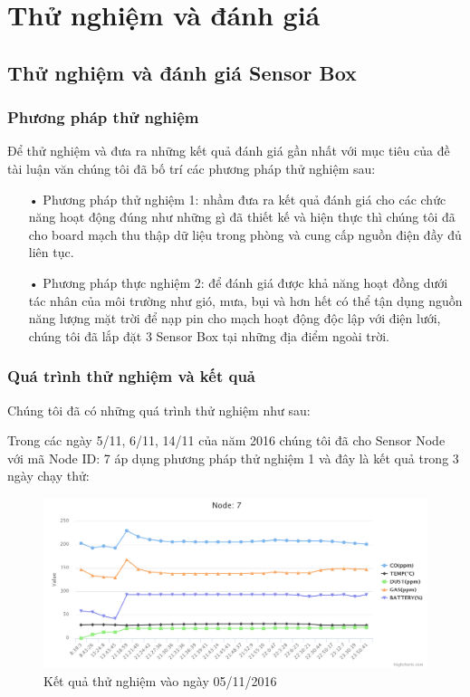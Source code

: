 \section{Thử nghiệm và đánh giá}
\subsection{Thử nghiệm và đánh giá Sensor Box}
\subsubsection*{Phương pháp thử nghiệm}
Để thử nghiệm và đưa ra những kết quả đánh giá gần nhất với mục tiêu của đề tài luận văn chúng tôi đã bố trí các phương pháp thử nghiệm sau:
\begin{itemize}
\item[•] Phương pháp thử nghiệm 1: nhầm đưa ra kết quả đánh giá cho các chức năng hoạt động đúng như những gì đã thiết kế và hiện thực thì chúng tôi đã cho board mạch thu thập dữ liệu trong phòng và cung cấp nguồn điện đầy đủ liên tục.
\item[•] Phương pháp thực nghiệm 2: để đánh giá được khả năng hoạt đồng dưới tác nhân của môi trường như gió, mưa, bụi và hơn hết có thể tận dụng nguồn năng lượng mặt trời để nạp pin cho mạch hoạt động độc lập với điện lưới, chúng tôi đã lắp đặt 3 Sensor Box tại những địa điểm ngoài trời.

\end{itemize}

\subsubsection*{Quá trình thử nghiệm và kết quả}
Chúng tôi đã có những quá trình thử nghiệm như sau:

Trong các ngày 5/11, 6/11, 14/11 của năm 2016 chúng tôi đã cho Sensor Node với mã Node ID: 7 áp dụng phương pháp thử nghiệm 1 và đây là kết quả trong 3 ngày chạy thử:
\begin{figure}[H]
	\centering    
	\includegraphics[width=6in]{5nov}
	\caption[Kết quả thử nghiệm vào ngày 05/11/2016]{Kết quả thử nghiệm vào ngày 05/11/2016}
	\label{fig:5nov}
\end{figure}

